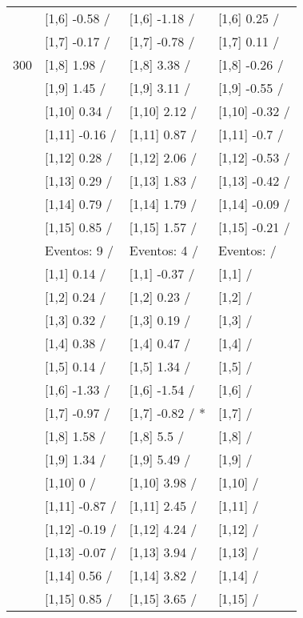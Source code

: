 \begin{table}
\begin{tabular}[t]{llll}
 & {}[1,6] -0.58  / & {}[1,6] -1.18  / & {}[1,6] 0.25  /\\
 & {}[1,7] -0.17  / & {}[1,7] -0.78  / & {}[1,7] 0.11  /\\
300 & {}[1,8] 1.98  / & {}[1,8] 3.38  / & {}[1,8] -0.26  /\\
\addlinespace
 & {}[1,9] 1.45  / & {}[1,9] 3.11  / & {}[1,9] -0.55  /\\
 & {}[1,10] 0.34  / & {}[1,10] 2.12  / & {}[1,10] -0.32  /\\
 & {}[1,11] -0.16  / & {}[1,11] 0.87  / & {}[1,11] -0.7  /\\
 & {}[1,12] 0.28  / & {}[1,12] 2.06  / & {}[1,12] -0.53  /\\
 & {}[1,13] 0.29  / & {}[1,13] 1.83  / & {}[1,13] -0.42  /\\
\addlinespace
 & {}[1,14] 0.79  / & {}[1,14] 1.79  / & {}[1,14] -0.09  /\\
 & {}[1,15] 0.85  / & {}[1,15] 1.57  / & {}[1,15] -0.21  /\\
 & Eventos:  9 / & Eventos:  4 / & Eventos:   /\\
 & {}[1,1] 0.14  / & {}[1,1] -0.37  / & {}[1,1]  /\\
 & {}[1,2] 0.24  / & {}[1,2] 0.23  / & {}[1,2]  /\\
\addlinespace
 & {}[1,3] 0.32  / & {}[1,3] 0.19  / & {}[1,3]  /\\
 & {}[1,4] 0.38  / & {}[1,4] 0.47  / & {}[1,4]  /\\
 & {}[1,5] 0.14  / & {}[1,5] 1.34  / & {}[1,5]  /\\
 & {}[1,6] -1.33  / & {}[1,6] -1.54  / & {}[1,6]  /\\
 & {}[1,7] -0.97  / & {}[1,7] -0.82  / * & {}[1,7]  /\\
\addlinespace
500 & {}[1,8] 1.58  / & {}[1,8] 5.5  / & {}[1,8]  /\\
 & {}[1,9] 1.34  / & {}[1,9] 5.49  / & {}[1,9]  /\\
 & {}[1,10] 0  / & {}[1,10] 3.98  / & {}[1,10]  /\\
 & {}[1,11] -0.87  / & {}[1,11] 2.45  / & {}[1,11]  /\\
 & {}[1,12] -0.19  / & {}[1,12] 4.24  / & {}[1,12]  /\\
\addlinespace
 & {}[1,13] -0.07  / & {}[1,13] 3.94  / & {}[1,13]  /\\
 & {}[1,14] 0.56  / & {}[1,14] 3.82  / & {}[1,14]  /\\
 & {}[1,15] 0.85  / & {}[1,15] 3.65  / & {}[1,15]  /\\
\bottomrule
\end{tabular}
\end{table}
